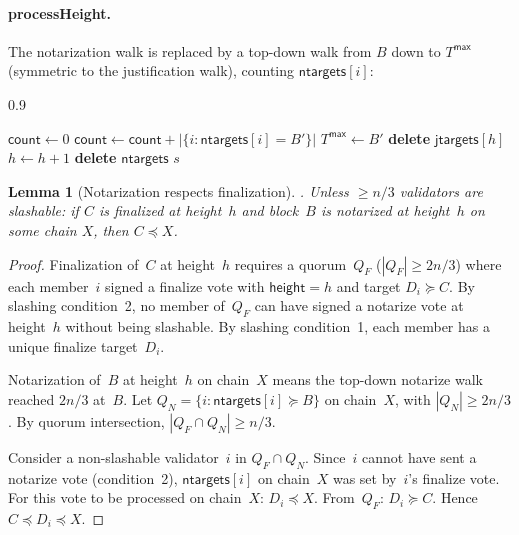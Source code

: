 \ifx\litemode\undefined\documentclass{article}\fi
\newcommand{\jtargets}{\mathsf{jtargets}}
\newcommand{\ntargets}{\mathsf{ntargets}}
\newcommand{\height}{\mathsf{height}}
\newcommand{\cnt}{\mathsf{count}}
\theoremstyle{plain}
\newtheorem{lemma}{Lemma}
\theoremstyle{definition}
\theoremstyle{remark}
\begin{document}
\paragraph{processHeight.} The notarization walk is replaced by a top-down walk from $B$ down to $T^\mathsf{max}$ (symmetric to the justification walk), counting $\ntargets[i]$:
\begin{center}
\begin{boxedminipage}{0.9\textwidth}
\begin{algorithmic}[1]
  \State $\cnt \gets 0$ 
    \State $\cnt \gets \cnt + |\{i : \ntargets[i] = B'\}|$
    \If{$\cnt \geq 2n/3$} 
        \State $T^\mathsf{max}\gets B'$
      \Else
        \State \textbf{delete} $\jtargets[h]$
      \EndIf
      \State $h \gets h + 1$
      \State \textbf{delete} $\ntargets$
      \State \Return $s$
    \EndIf
  \EndFor
\end{algorithmic}
\end{boxedminipage}
\end{center}

\begin{lemma}[Notarization respects finalization]
.
Unless $\geq n/3$ validators are slashable: if $C$ is finalized at height~$h$ and block~$B$ is notarized at height~$h$ on some chain $X$, then $C \preceq X$.
\end{lemma}

\begin{proof}
Finalization of~$C$ at height~$h$ requires a quorum~$Q_F$ ($|Q_F| \geq 2n/3$) where each member~$i$ signed a finalize vote with $\height = h$ and target $D_i \succeq C$.
By slashing condition~2, no member of~$Q_F$ can have signed a notarize vote at height~$h$ without being slashable.
By slashing condition~1, each member has a unique finalize target~$D_i$.

Notarization of~$B$ at height~$h$ on chain~$X$ means the top-down notarize walk reached $2n/3$ at~$B$.
Let $Q_N = \{i : \ntargets[i] \succeq B\}$ on chain~$X$, with $|Q_N| \geq 2n/3$.
By quorum intersection, $|Q_F \cap Q_N| \geq n/3$.

Consider a non-slashable validator~$i$ in $Q_F \cap Q_N$.
Since~$i$ cannot have sent a notarize vote (condition~2), $\ntargets[i]$ on chain~$X$ was set by~$i$'s finalize vote.
For this vote to be processed on chain~$X$: $D_i \preceq X$.
From~$Q_F$: $D_i \succeq C$.
Hence $C \preceq D_i \preceq X$.
\end{proof}
\end{document}
